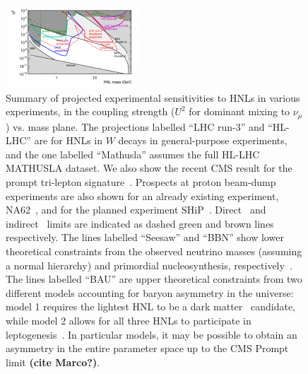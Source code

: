 \begin{figure}[th]
\centering
\includegraphics[width=0.99\linewidth]{plots/BigPicture.pdf}
\caption{Summary of projected experimental sensitivities to HNLs in various experiments, in the coupling strength ($U^2$ for dominant mixing to $\nu_\mu$) vs. mass plane. The projections labelled ``LHC run-3'' and ``HL-LHC'' are for HNLs in $W$ decays in general-purpose experiments, and the one labelled ``Mathusla'' assumes the full HL-LHC MATHUSLA dataset. We also show the recent CMS result for the prompt tri-lepton signature~\cite{Sirunyan:2018mtv}. Prospects at proton beam-dump experiments are also shown for an already existing experiment, NA62~\cite{Lanfranchi2017}, and for the planned experiment SHiP~\cite{SHiP2015}. Direct~\cite{Bernardi1988,CHARM1986,NuTeV1999,Delphi1997,CMS2015b} and indirect~\cite{MEG2013,Antusch2015} limits are indicated as dashed green and brown lines respectively. The lines labelled ``Seesaw'' and ``BBN'' show lower theoretical constraints from the observed neutrino masses (assuming a normal hierarchy) and primordial nucleosynthesis, respectively~\cite{Canetti2013b}. The lines labelled ``BAU'' are upper theoretical constraints from two different models accounting for baryon asymmetry in the universe: model 1 requires the lightest HNL to be a dark matter~\cite{Canetti2013b} candidate, while model 2 allows for all three HNLs to participate in leptogenesis~\cite{Canetti2014}. In particular models, it may be possible to obtain an asymmetry in the entire parameter space up to the CMS Prompt limit {\bf (cite Marco?)}. }
\label{fig:HNLsensitivity}
\end{figure}

